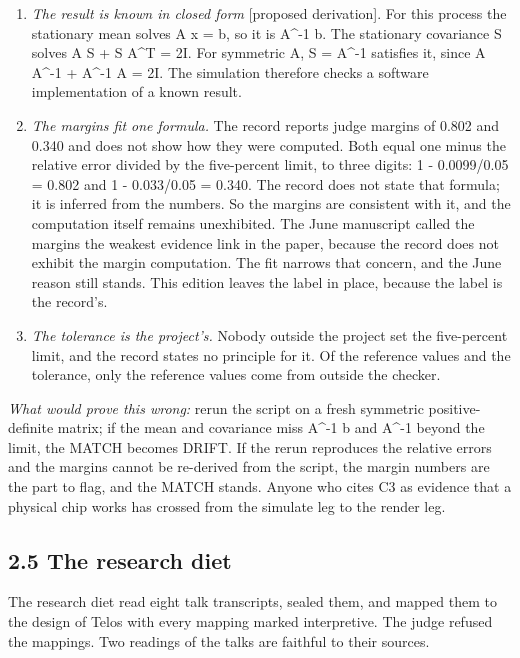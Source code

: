 \documentclass[11pt]{article}
\begin{document}
\begin{enumerate}
\item \emph{The result is known in closed form} [proposed derivation]. For this process the stationary mean solves A x = b, so it is A\textasciicircum{}-1 b. The stationary covariance S solves A S + S A\textasciicircum{}T = 2I. For symmetric A, S = A\textasciicircum{}-1 satisfies it, since A A\textasciicircum{}-1 + A\textasciicircum{}-1 A = 2I. The simulation therefore checks a software implementation of a known result.
\item \emph{The margins fit one formula.} The record reports judge margins of 0.802 and 0.340 and does not show how they were computed. Both equal one minus the relative error divided by the five-percent limit, to three digits: 1 - 0.0099/\allowbreak{}0.05 = 0.802 and 1 - 0.033/\allowbreak{}0.05 = 0.340. The record does not state that formula; it is inferred from the numbers. So the margins are consistent with it, and the computation itself remains unexhibited. The June manuscript called the margins the weakest evidence link in the paper, because the record does not exhibit the margin computation. The fit narrows that concern, and the June reason still stands. This edition leaves the label in place, because the label is the record's.
\item \emph{The tolerance is the project's.} Nobody outside the project set the five-percent limit, and the record states no principle for it. Of the reference values and the tolerance, only the reference values come from outside the checker.
\end{enumerate}
\emph{What would prove this wrong:} rerun the script on a fresh symmetric positive-definite matrix; if the mean and covariance miss A\textasciicircum{}-1 b and A\textasciicircum{}-1 beyond the limit, the MATCH becomes DRIFT. If the rerun reproduces the relative errors and the margins cannot be re-derived from the script, the margin numbers are the part to flag, and the MATCH stands. Anyone who cites C3 as evidence that a physical chip works has crossed from the simulate leg to the render leg.

\subsection*{2.5 The research diet}

The research diet read eight talk transcripts, sealed them, and mapped them to the design of Telos with every mapping marked interpretive. The judge refused the mappings. Two readings of the talks are faithful to their sources.
\end{document}
